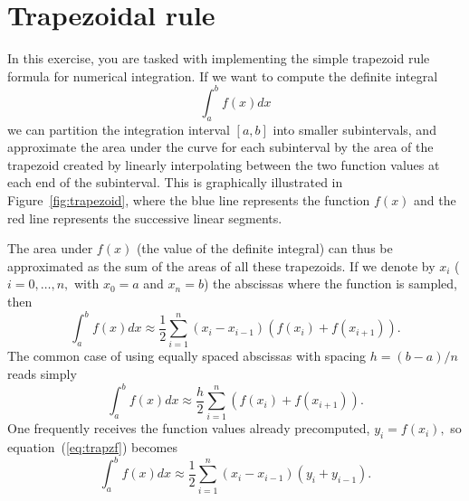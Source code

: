 \section{Trapezoidal rule}
\label{sec:trapezoid}

In this exercise, you are tasked with implementing the simple trapezoid
rule formula for numerical integration. If we want to compute the
definite integral \begin{equation}
\int_{a}^{b}f(x)dx\end{equation}
we can partition the integration interval $[a,b]$ into smaller subintervals,
and approximate the area under the curve for each subinterval by the
area of the trapezoid created by linearly interpolating between the
two function values at each end of the subinterval. This is graphically
illustrated in Figure~\ref{fig:trapezoid}, where the blue line represents
the function $f(x)$ and the red line represents the successive linear
segments.

The area under $f(x)$ (the value of the definite integral) can thus
be approximated as the sum of the areas of all these trapezoids. If
we denote by $x_{i}$ ($i=0,\ldots,n,$ with $x_{0}=a$ and $x_{n}=b$)
the abscissas where the function is sampled, then \begin{equation}
\int_{a}^{b}f(x)dx\approx\frac{1}{2}\sum_{i=1}^{n}\left(x_{i}-x_{i-1}\right)\left(f(x_{i})+f(x_{i+1})\right).\label{eq:trapzf}\end{equation}
The common case of using equally spaced abscissas with spacing $h=(b-a)/n$
reads simply \begin{equation}
\int_{a}^{b}f(x)dx\approx\frac{h}{2}\sum_{i=1}^{n}\left(f(x_{i})+f(x_{i+1})\right).\label{eq:trapzf2}\end{equation}
One frequently receives the function values already precomputed, $y_{i}=f(x_{i}),$
so equation~(\ref{eq:trapzf}) becomes \begin{equation}
\int_{a}^{b}f(x)dx\approx\frac{1}{2}\sum_{i=1}^{n}\left(x_{i}-x_{i-1}\right)\left(y_{i}+y_{i-1}\right).\label{eq:trapz}\end{equation}


